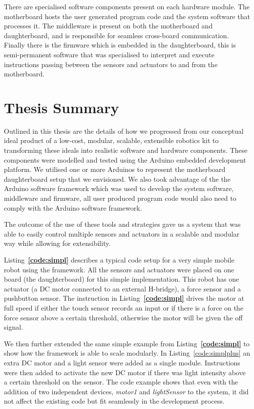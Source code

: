 There are specialised software components present on each hardware module. The motherboard hosts the user generated program code and the system software that processes it. The middleware is present on both the motherboard and daughterboard, and is responsible for seamless cross-board communication. Finally there is the firmware which is embedded in the daughterboard, this is semi-permanent software that was specialised to interpret and execute instructions passing between the sensors and actuators to and from the motherboard.

\section{Thesis Summary}
Outlined in this thesis are the details of how we progressed from our conceptual ideal product of a low-cost, modular, scalable, extensible robotics kit to transforming these ideals into realistic software and hardware components. These components were modelled and tested using the Arduino embedded development platform. We utilised one or more Arduinos to represent the motherboard daughterboard setup that we envisioned. We also took advantage of the the Arduino software framework which was used to develop the system software, middleware and firmware, all user produced program code would also need to comply with the Arduino software framework.

The outcome of the use of these tools and strategies gave us a system that was able to easily control multiple sensors and actuators in a scalable and modular way while allowing for extensibility.

Listing~\textbf{\ref{code:simpl}} describes a typical code setup for a very simple mobile robot using the \xten framework. All the sensors and actuators were placed on one board (the daughterboard) for this simple implementation. This robot has one actuator (a DC motor connected to an external H-bridge), a force sensor and a pushbutton sensor. The instruction in Listing~\textbf{\ref{code:simpl}} drives the motor at full speed if either the touch sensor records an input or if there is a force on the force sensor above a certain threshold, otherwise the motor will be given the off signal.

 We then further extended the same simple example from Listing~\textbf{\ref{code:simpl}} to show how the \xten framework is able to scale modularly.
 In Listing~\ref{code:simplplus} an extra DC motor and a light sensor were added as a single module. Instructions were then added to activate the new DC motor if there was light intensity above a certain threshold on the sensor. The code example shows that even with the addition of two independent devices, \emph{motor1} and \emph{lightSensor} to the system, it did not affect the existing code but fit seamlessly in the development process.
 

